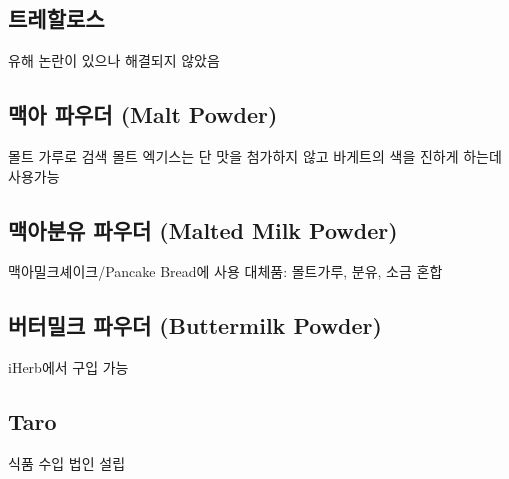 \documentclass{myproc}
\begin{document}
\subsection{\textcolor{blue2}{트레할로스}}
\bit
\w 유해 논란이 있으나 해결되지 않았음
\eit

\subsection{\textcolor{green2}{맥아 파우더  (Malt Powder)}}
\bit
\w 몰트 가루로 검색
\w 몰트 엑기스는 단 맛을 첨가하지 않고 바게트의 색을 진하게 하는데 사용가능
\eit
\subsection{\textcolor{green2}{맥아분유 파우더  (Malted Milk Powder)}}
\bit
\w 맥아밀크셰이크/Pancake Bread에 사용
\w 대체품: 몰트가루, 분유, 소금  혼합
\eit
\subsection{\textcolor{green2}{버터밀크 파우더 (Buttermilk Powder)}}
\bit
\w iHerb에서 구입 가능
\eit

\subsection{\textcolor{green2}{Taro}}
\bit
\w 식품 수입 법인 설립
\eit


\vspace*{1cm}

\tableofcontents
\end{document}
